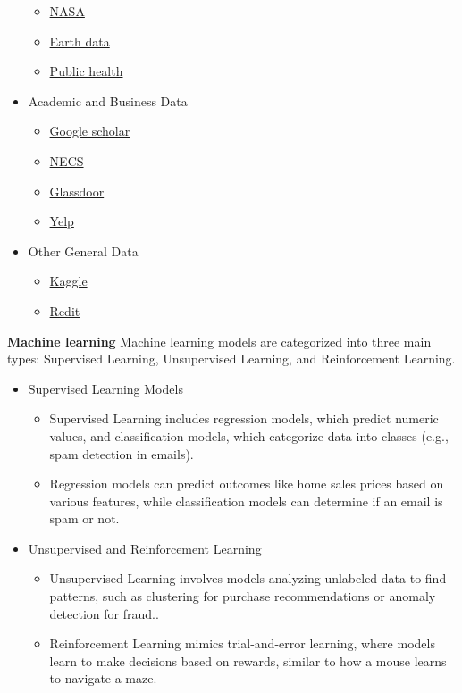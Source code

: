 \documentclass[12pt]{report} %
\begin{document}
\begin{itemize}
\begin{itemize}
			\item \href{https://pds.nasa.gov/}{NASA}
			\item \href{https://earthdata.nasa.gov/}{Earth data}
			\item \href{https://www.sgim.org/communities/research/dataset-compendium/public-datasets-topic-grid}{Public health}
		\end{itemize}
	\item Academic and Business Data
		\begin{itemize}
			\item \href{https://scholar.google.com/}{Google scholar}
			\item \href{https://nces.ed.gov/}{NECS}
			\item \href{https://www.glassdoor.com/research/}{Glassdoor}
			\item \href{https://www.yelp.com/dataset}{Yelp}
		\end{itemize}
	\item Other General Data
		\begin{itemize}
			\item \href{https://www.kaggle.com/datasets}{Kaggle}
			\item \href{https://www.reddit.com/r/datasets/}{Redit}
		\end{itemize}
	\end{itemize}

	
		\noindent\textbf{Machine learning}
		Machine learning models are categorized into three main types: Supervised Learning, Unsupervised Learning, and Reinforcement Learning.
		\begin{itemize}
			\item Supervised Learning Models
			\begin{itemize}
				\item Supervised Learning includes regression models, which predict numeric values, and classification models, which categorize data into classes (e.g., spam detection in emails).
				\item Regression models can predict outcomes like home sales prices based on various features, while classification models can determine if an email is spam or not.
			\end{itemize}
			\item Unsupervised and Reinforcement Learning
			\begin{itemize}
				\item Unsupervised Learning involves models analyzing unlabeled data to find patterns, such as clustering for purchase recommendations or anomaly detection for fraud..
				\item Reinforcement Learning mimics trial-and-error learning, where models learn to make decisions based on rewards, similar to how a mouse learns to navigate a maze.
			\end{itemize}
		\end{itemize}
		
\end{document}
